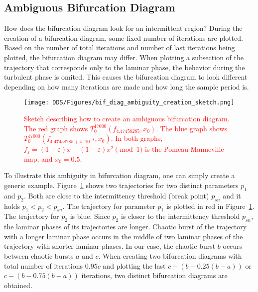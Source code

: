 \subsection{Ambiguous Bifurcation Diagram}
\label{sec:ambiguous_bif_diag}
How does the bifurcation diagram look for an intermittent region?
During the creation of a bifurcation diagram, some fixed number of iterations are plotted.
Based on the number of total iterations and number of last iterations being plotted, the bifurcation diagram may differ.
When plotting a subsection of the trajectory that corresponds only to the laminar phase, the behavior during the turbulent phase is omited.
This causes the bifurcation diagram to look different depending on how many iterations are made and how long the sample period is.
\par
\begin{figure}[!h]
    \centering
    \texttt{[image: DDS/Figures/bif\_diag\_ambiguity\_creation\_sketch.png]}
    \caption{
        \textcolor{red}{
        Sketch describing how to create an ambiguous bifurcation diagram. 
        The red graph shows $T^{17000}_{0}(f_{4.47458285}, x_0)$. 
        The blue graph shows $T^{17000}_{0}(f_{4.47458285+4 \cdot 10^{-8}}, x_0)$. 
        In both graphs, $f_{\varepsilon} = (1+\varepsilon)x+(1-\varepsilon)x^2 \pmod{1}$ is the Pomeau-Manneville map, and $x_0 = 0.5$.
        }
    }
    \label{fig:ambiguous_bif_diag}
\end{figure}

To illustrate this ambiguity in bifurcation diagram, one can simply create a generic example.
Figure~\ref{fig:ambiguous_bif_diag} shows two trajectories for two distinct parameters $p_1$ and $p_2$.
Both are close to the intermittency threshold (break point) $p_{sn}$ and it holds $p_1 < p_2 < p_{sn}$.
The trajectory for parameter $p_1$ is plotted in red in Figure~\ref{fig:ambiguous_bif_diag}.
The trajectory for $p_2$ is blue.
Since $p_2$ is closer to the intermittency threshold $p_{sn}$, the laminar phases of its trajectories are longer.
Chaotic burst of the trajectory with a longer laminar phase occurs in the middle of two laminar phases of the trajectory with shorter laminar phases.
In our case, the chaotic burst $b$ occurs between chaotic bursts $a$ and $c$.
When creating two bifurcation diagrams with total number of iterations $0.95 c$ and plotting the last $c-(b-0.25(b-a))$ or $c-(b-0.75(b-a))$ iterations, two distinct bifurcation diagrams are obtained.

